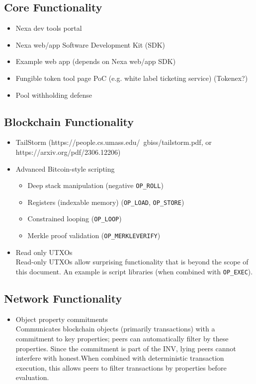 \documentclass[a4paper, 11pt]{article}
\begin{document}
\subsection{Core Functionality}
\begin{itemize}
    \item Nexa dev tools portal
    \item Nexa web/app Software Development Kit (SDK)
    \item Example web app (depends on Nexa web/app SDK)
    \item Fungible token tool page PoC (e.g. white label ticketing service) (Tokenex?)
    \item Pool withholding defense
\end{itemize}

\subsection{Blockchain Functionality}
\begin{itemize}
    \item TailStorm (https://people.cs.umass.edu/~gbiss/tailstorm.pdf, or https://arxiv.org/pdf/2306.12206)
    \item Advanced Bitcoin-style scripting
    \begin{itemize}
        \item Deep stack manipulation (negative \verb|OP_ROLL|)
        \item Registers (indexable memory) (\verb|OP_LOAD|, \verb|OP_STORE|)
        \item Constrained looping (\verb|OP_LOOP|)
        \item Merkle proof validation (\verb|OP_MERKLEVERIFY|)
    \end{itemize}
    \item Read only UTXOs\\
        Read-only UTXOs allow surprising functionality that is beyond the scope of this document.  An example is script libraries (when combined with \verb|OP_EXEC|).
\end{itemize}

\subsection{Network Functionality}
\begin{itemize}
    \item Object property commitments\\
        Communicates blockchain objects (primarily transactions) with a commitment to key properties; peers can automatically filter by these properties.  Since the commitment is part of the INV, lying peers cannot interfere with honest.When combined with deterministic transaction execution, this allows peers to filter transactions by properties before evaluation.
\end{itemize}
\end{document}
